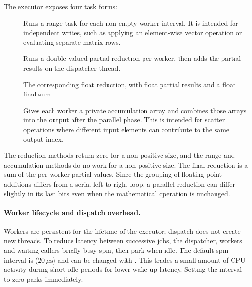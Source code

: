 \documentclass[main.tex]{subfiles}
\begin{document}
    The executor exposes four task forms:
    \begin{description}
        \item[] Runs a range task for each non-empty worker interval. It is intended for independent writes, such as applying an element-wise vector operation or evaluating separate matrix rows.
        \item[] Runs a double-valued partial reduction per worker, then adds the partial results on the dispatcher thread.
        \item[] The corresponding float reduction, with float partial results and a float final sum.
        \item[] Gives each worker a private accumulation array and combines those arrays into the output after the parallel phase. This is intended for scatter operations where different input elements can contribute to the same output index.
    \end{description}

    The reduction methods return zero for a non-positive size, and the range and accumulation methods do no work for a non-positive size. The final reduction is a sum of the per-worker partial values. Since the grouping of floating-point additions differs from a serial left-to-right loop, a parallel reduction can differ slightly in its last bits even when the mathematical operation is unchanged.

    \paragraph{Worker lifecycle and dispatch overhead.}
    Workers are persistent for the lifetime of the executor; dispatch does not create new threads. To reduce latency between successive jobs, the dispatcher, workers and waiting callers briefly busy-spin, then park when idle. The default spin interval is  ($20\,\mu\mathrm{s}$) and can be changed with . This trades a small amount of CPU activity during short idle periods for lower wake-up latency. Setting the interval to zero parks immediately.
\end{document}
